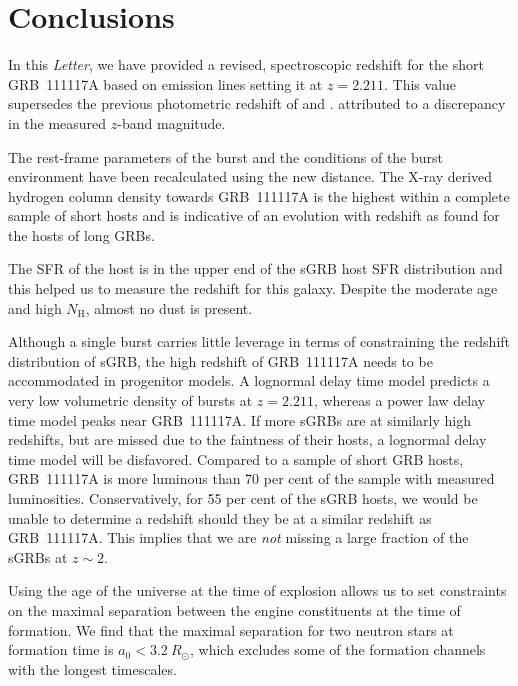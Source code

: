 \documentclass{aa}    %
\begin{document}
\section{Conclusions}

In this \emph{Letter}, we have provided a revised, spectroscopic redshift for
the short GRB~111117A based on emission lines setting it at $z = 2.211$. This
value supersedes the previous photometric redshift of \citet{Margutti2012} and
\citet{Sakamoto2013}. %
attributed to a discrepancy in the measured $z$-band magnitude.

The rest-frame parameters of the burst and the conditions of the burst
environment have been recalculated using the new distance. The X-ray derived
hydrogen column density towards GRB~111117A is the highest within a complete
sample of short hosts and is indicative of an evolution with redshift as found
for the hosts of long GRBs.

The SFR of the host is in the upper end of the sGRB host SFR distribution and
this helped us to measure the redshift for this galaxy. Despite the moderate age
and high $N_\mathrm{H}$, almost no dust is present.

Although a single burst carries little leverage in terms of constraining the
redshift distribution of sGRB, the high redshift of GRB~111117A needs to be
accommodated in progenitor models. A lognormal delay time model predicts a very low volumetric
density of bursts at $z = 2.211$, whereas a power law delay time model peaks
near GRB~111117A. If more sGRBs are at similarly high redshifts, but are missed due to
the faintness of their hosts, a lognormal delay time model will be disfavored.
Compared to a sample of short GRB hosts, GRB~111117A is more luminous than 70 per
cent of the sample with measured luminosities. Conservatively, for 55 per
cent of the sGRB hosts, we would be unable to determine a redshift should they be at 
a similar redshift as GRB~111117A. This implies that we are \textit{not} missing a large
fraction of the sGRBs at $z \sim 2$.

Using the age of the universe at the time of explosion allows us to set
constraints on the maximal separation between the engine constituents at the
time of formation. We find that the maximal separation for two neutron stars at
formation time is $a_0 < 3.2~R_\odot$, which excludes some of the formation
channels with the longest timescales.
\end{document}
